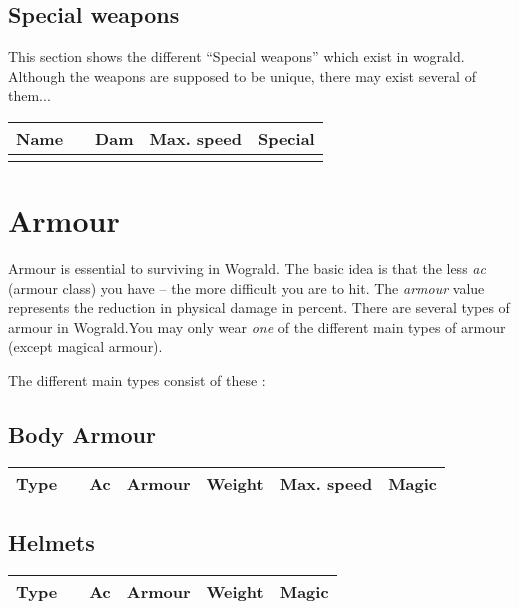 \documentclass[11pt, a4paper]{article}
\begin{document}
\subsection*{Special weapons}

This section shows the different ``Special weapons'' which exist in
wograld.  Although the weapons are supposed to be unique, there may
exist several of them...

{\small 
\begin{longtable}{|c|c|r|r|p{7cm}|}
\hline
Name&&Dam&Max. speed&Special\\
\hline
\hline
\endhead
\hline
\endfoot

\end{longtable}
}

\section*{Armour}
 
Armour is essential to surviving in Wograld.
The basic idea is that the less {\it ac} (armour class) you have -- the more 
difficult you are to hit.
The {\it armour} value represents the reduction in physical damage in percent.
There are several types of armour in Wograld.You may only wear {\em one}
of the different main types of armour (except magical armour).

The different main types consist of these :
\subsection*{Body Armour}

{\small 
\begin{center}
\begin{tabular}{|c|c|r|r|r|r|p{4cm}|}
\hline
Type&&Ac& Armour&Weight&Max. speed&Magic\\
\hline
\hline

\hline
\end{tabular}
\end{center} 
}
\subsection*{Helmets}

{\small 
\begin{center}
\begin{tabular}{|c|c|r|r|r|p{6cm}|}
\hline
Type&&Ac&Armour&Weight&Magic\\
\hline
\hline

\hline
\end{tabular}
\end{center} 
}
\end{document}
